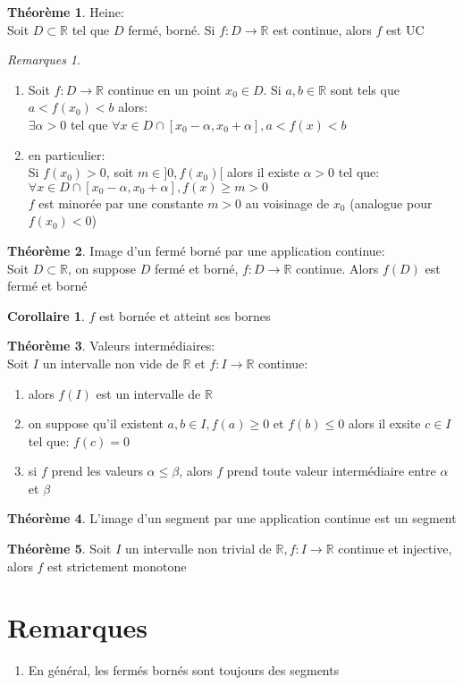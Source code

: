 \documentclass[fleqn]{article}
\theoremstyle{definition} \newtheorem*{defi}{D\'efinition}
\theoremstyle{definition} \newtheorem*{theo}{Th\'eor\`eme}
\theoremstyle{definition} \newtheorem*{coro}{Corollaire}
\theoremstyle{remark} \newtheorem*{rqs}{Remarques}
\begin{document}
\begin{theo} Heine: \\
	Soit $D \subset \mathbb{R}$ tel que $D$ ferm\'e, born\'e. Si $f:D \rightarrow \mathbb{R}$ est continue, alors $f$ est UC
\end{theo}
\begin{rqs} $ $
	\begin{enumerate}
		\item Soit $f: D \rightarrow \mathbb{R}$ continue en un point $x_0 \in D$. Si $a, b \in \mathbb{R}$ sont tels que $a < f(x_0) < b$
			alors: \\
			$ \exists \alpha > 0$ tel que $\forall x \in D \cap [x_0 - \alpha, x_0 + \alpha], a < f(x) < b$
		\item en particulier: \\
			Si $f(x_0) > 0$, soit $m \in ]0, f(x_0)[$ alors il existe $\alpha >0$ tel que:
			$\forall x \in D \cap [x_0 - \alpha, x_0 + \alpha], f(x) \geq m > 0$ \\
			$f$ est minor\'ee par une constante $m>0$ au voisinage de $x_0$ (analogue pour $f(x_0) < 0$)
	\end{enumerate}
\end{rqs}

\begin{theo}
	Image d'un ferm\'e born\'e par une application continue: \\
	Soit $D \subset \mathbb{R}$, on suppose $D$ ferm\'e et born\'e, $f:D \rightarrow \mathbb{R}$ continue. Alors $f(D)$ est ferm\'e et born\'e
	\begin{coro}
		$f$ est born\'ee et atteint ses bornes
	\end{coro}
\end{theo}
\begin{theo}
	Valeurs interm\'ediaires: \\
	Soit $I$ un intervalle non vide de $\mathbb{R}$ et $f:I \rightarrow \mathbb{R}$ continue:
	\begin{enumerate}
		\item alors $f(I)$ est un intervalle de $\mathbb{R}$
		\item on suppose qu'il existent $a,b \in I, f(a) \geq 0$ et $f(b) \leq 0$ alors il exsite $c \in I$ tel que: $f(c) = 0$
		\item si $f$ prend les valeurs $\alpha \leq \beta$, alors $f$ prend toute valeur interm\'ediaire entre $\alpha$ et $\beta$
	\end{enumerate}
\end{theo}
\begin{theo}
	L'image d'un segment par une application continue est un segment
\end{theo}
\begin{theo}
	Soit $I$ un intervalle non trivial de $\mathbb{R}, f:I \rightarrow \mathbb{R}$ continue et injective, alors $f$ est strictement monotone
\end{theo}

\section{Remarques}
\begin{enumerate}
	\item En g\'en\'eral, les ferm\'es born\'es sont toujours des segments
\end{enumerate}
\end{document}
